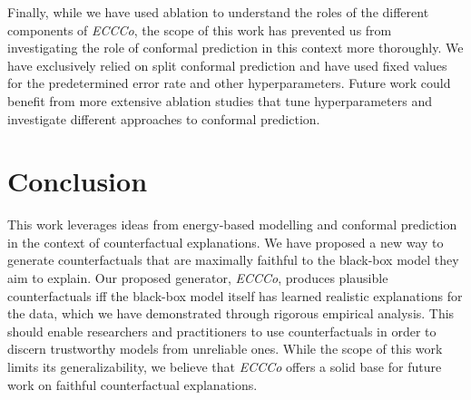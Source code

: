Finally, while we have used ablation to understand the roles of the different components of \textit{ECCCo}, the scope of this work has prevented us from investigating the role of conformal prediction in this context more thoroughly. We have exclusively relied on split conformal prediction and have used fixed values for the predetermined error rate and other hyperparameters. Future work could benefit from more extensive ablation studies that tune hyperparameters and investigate different approaches to conformal prediction.

\section{Conclusion}

This work leverages ideas from energy-based modelling and conformal prediction in the context of counterfactual explanations. We have proposed a new way to generate counterfactuals that are maximally faithful to the black-box model they aim to explain. Our proposed generator, \textit{ECCCo}, produces plausible counterfactuals iff the black-box model itself has learned realistic explanations for the data, which we have demonstrated through rigorous empirical analysis. This should enable researchers and practitioners to use counterfactuals in order to discern trustworthy models from unreliable ones. While the scope of this work limits its generalizability, we believe that \textit{ECCCo} offers a solid base for future work on faithful counterfactual explanations.
